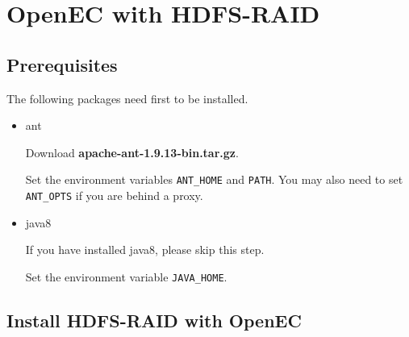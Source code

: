 \documentclass[letterpaper,12pt]{article}
\begin{document}
\section{OpenEC with HDFS-RAID}
\label{sec:hdfsraid}

\subsection{Prerequisites}

The following packages need first to be installed.

\begin{itemize}

\item ant  

Download {\bf apache-ant-1.9.13-bin.tar.gz}.

\begin{center}
\noindent{}
\end{center}

Set the environment variables {\tt ANT\_HOME} and {\tt PATH}.  You may also
need to set {\tt ANT\_OPTS} if you are behind a proxy.

\begin{center}
\noindent{}
\end{center}

\item java8

If you have installed java8, please skip this step.

\begin{center}
\noindent{}
\end{center}

Set the environment variable {\tt JAVA\_HOME}.

\end{itemize}

\subsection{Install HDFS-RAID with OpenEC}
\end{document}
